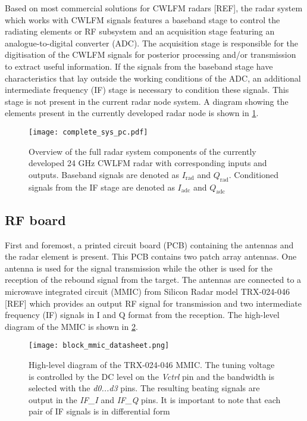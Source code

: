 Based on most commercial solutions for CWLFM radars [REF], the radar system which works with CWLFM signals features a baseband stage to control the radiating elements or RF subsystem and an acquisition stage featuring an analogue-to-digital converter (ADC). The acquisition stage is responsible for the digitisation of the CWLFM signals for posterior processing and/or transmission to extract useful information. If the signals from the baseband stage have characteristics that lay outside the working conditions of the ADC, an additional intermediate frequency (IF) stage is necessary to condition these signals. This stage is not present in the current radar node system. A diagram showing the elements present in the currently developed radar node is shown in \cref{fig:system}.

\begin{figure}[ht]
	\centering
	\texttt{[image: complete\_sys\_pc.pdf]}
	\caption{Overview of the full radar system components of the currently developed 24 GHz CWLFM radar with corresponding inputs and outputs. Baseband signals are denoted as $I_{\mathrm{rad}}$ and $Q_{\mathrm{rad}}$. Conditioned signals from the IF stage are denoted as $I_{\mathrm{adc}}$ and $Q_{\mathrm{adc}}$ \label{fig:system}} %
\end{figure}

\subsection{RF board} \label{sec:rf_board_general}

First and foremost, a printed circuit board (PCB) containing the antennas and the radar element is present. This PCB contains two patch array antennas. One antenna is used for the signal transmission while the other is used for the reception of the rebound signal from the target. The antennas are connected to a microwave integrated circuit (MMIC) from Silicon Radar model TRX-024-046 [REF] which provides an output RF signal for transmission and two intermediate frequency (IF) signals in I and Q format from the reception. The high-level diagram of the MMIC is shown in \cref{fig:block_mmic_general}.

\begin{figure}[ht]
	\centering
	\texttt{[image: block\_mmic\_datasheet.png]}
	\caption{High-level diagram of the TRX-024-046 MMIC. The tuning voltage is controlled by the DC level on the \textit{Vctrl} pin and the bandwidth is selected with the \textit{d0...d3} pins. The resulting beating signals are output in the \textit{IF\_I} and \textit{IF\_Q} pins. It is important to note that each pair of IF signals is in differential form \label{fig:block_mmic_general}}
\end{figure}

